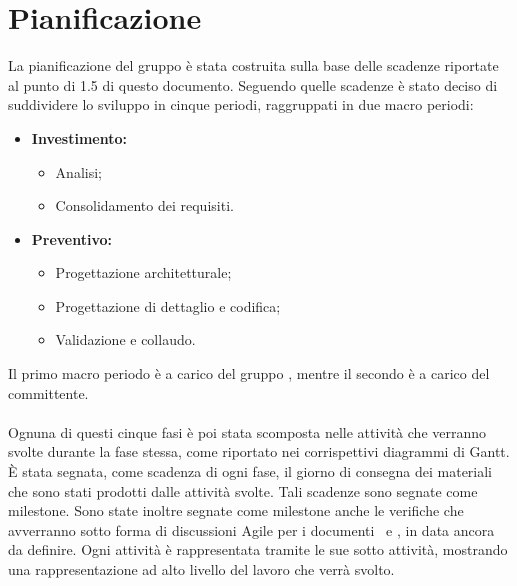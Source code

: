 \documentclass[PianoDiProgetto.tex]{subfiles}
\begin{document}
\chapter{Pianificazione}
La pianificazione del gruppo \gruppo è stata costruita sulla base delle scadenze riportate al punto di 1.5 di questo documento. Seguendo quelle scadenze è stato deciso di suddividere lo sviluppo in cinque periodi, raggruppati in due macro periodi:
\begin{itemize}
	\item \textbf{Investimento:}
		\begin{itemize}
			\item Analisi;
			\item Consolidamento dei requisiti.
		\end{itemize}
	\item \textbf{Preventivo:}
		\begin{itemize}
			\item Progettazione architetturale;
			\item Progettazione di dettaglio e codifica;
			\item Validazione e collaudo.
		\end{itemize}
\end{itemize}
Il primo macro periodo è a carico del gruppo \gruppo, mentre il secondo è a carico del committente.\\\\
Ognuna di questi cinque fasi è poi stata scomposta nelle attività che verranno svolte durante la fase stessa, come riportato nei corrispettivi diagrammi di Gantt. \`{E} stata segnata, come scadenza di ogni fase, il giorno di consegna dei materiali che sono stati prodotti dalle attività svolte. Tali scadenze sono segnate come milestone. Sono state inoltre segnate come milestone anche le verifiche che avverranno sotto forma di discussioni Agile per i documenti \tb\ e \pb, in data ancora da definire. Ogni attività è rappresentata tramite le sue sotto attività, mostrando una rappresentazione ad alto livello del lavoro che verrà svolto.
\newpage
\end{document}
